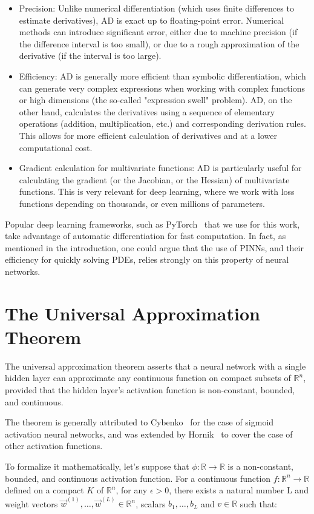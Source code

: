 \begin{itemize}
    \item Precision: Unlike numerical differentiation (which uses finite differences to estimate derivatives), AD is exact up to floating-point error. Numerical methods can introduce significant error, either due to machine precision (if the difference interval is too small), or due to a rough approximation of the derivative (if the interval is too large).
    \item Efficiency: AD is generally more efficient than symbolic differentiation, which can generate very complex expressions when working with complex functions or high dimensions (the so-called "expression swell" problem). AD, on the other hand, calculates the derivatives using a sequence of elementary operations (addition, multiplication, etc.) and corresponding derivation rules. This allows for more efficient calculation of derivatives and at a lower computational cost.
    \item Gradient calculation for multivariate functions: AD is particularly useful for calculating the gradient (or the Jacobian, or the Hessian) of multivariate functions. This is very relevant for deep learning, where we work with loss functions depending on thousands, or even millions of parameters.
\end{itemize}

Popular deep learning frameworks, such as PyTorch~\cite{NEURIPS2019_9015} that we use for this work, take advantage of automatic differentiation for fast computation. In fact, as mentioned in the introduction, one could argue that the use of PINNs, and their efficiency for quickly solving PDEs, relies strongly on this property of neural networks. 

\section{The Universal Approximation Theorem}
The universal approximation theorem asserts that a neural network with a single hidden layer can approximate any continuous function on compact subsets of $\mathbb{R}^n$, provided that the hidden layer's activation function is non-constant, bounded, and continuous.

The theorem is generally attributed to Cybenko~\cite{cybenko1989} for the case of sigmoid activation neural networks, and was extended by Hornik~\cite{hornik1991approximation} to cover the case of other activation functions.

To formalize it mathematically, let's suppose that $\phi : \mathbb{R} \rightarrow \mathbb{R}$ is a non-constant, bounded, and continuous activation function. For a continuous function $f : \mathbb{R}^n \rightarrow \mathbb{R}$ defined on a compact $K$ of $\mathbb{R}^n$, for any $\epsilon > 0$, there exists a natural number L and weight vectors $\Vec{w}^{(1)}, \dots, \Vec{w}^{(L)} \in \mathbb{R}^n$, scalars $b_1, \dots, b_L$ and $v \in \mathbb{R}$ such that:


